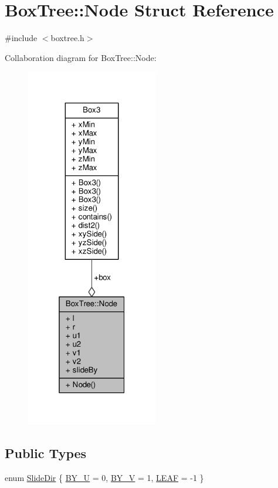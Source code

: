 \hypertarget{structBoxTree_1_1Node}{}\section{Box\+Tree\+:\+:Node Struct Reference}
\label{structBoxTree_1_1Node}


{\ttfamily \#include $<$boxtree.\+h$>$}



Collaboration diagram for Box\+Tree\+:\+:Node\+:
\nopagebreak
\begin{figure}[H]
\begin{center}
\leavevmode
\includegraphics[width=163pt]{structBoxTree_1_1Node__coll__graph}
\end{center}
\end{figure}
\subsection*{Public Types}
\begin{DoxyCompactItemize}
\item 
enum \hyperlink{structBoxTree_1_1Node_af862522c79bbea75bbbfa47614842295}{Slide\+Dir} \{ \hyperlink{structBoxTree_1_1Node_af862522c79bbea75bbbfa47614842295a8de683397fda85467d10531bdaf67577}{B\+Y\+\_\+U} = 0, 
\hyperlink{structBoxTree_1_1Node_af862522c79bbea75bbbfa47614842295acd6e4816ec952840b6cd2dc8261a3963}{B\+Y\+\_\+V} = 1, 
\hyperlink{structBoxTree_1_1Node_af862522c79bbea75bbbfa47614842295a06e0ae6f4066175d8a5739b775f52c83}{L\+E\+AF} = -\/1
 \}
\end{DoxyCompactItemize}
